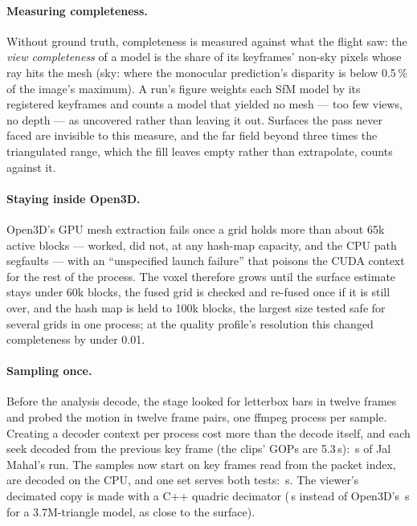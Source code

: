 \documentclass[10pt,a4paper,twocolumn]{article}
\begin{document}
\paragraph{Measuring completeness.} Without ground truth, completeness is measured against what the flight saw: the \emph{view completeness} of a model is the share of its keyframes' non-sky pixels whose ray hits the mesh (sky: where the monocular prediction's disparity is below 0.5\,\% of the image's maximum). A run's figure weights each SfM model by its registered keyframes and counts a model that yielded no mesh --- too few views, no depth --- as uncovered rather than leaving it out. Surfaces the pass never faced are invisible to this measure, and the far field beyond three times the triangulated range, which the fill leaves empty rather than extrapolate, counts against it.

\paragraph{Staying inside Open3D.} Open3D's GPU mesh extraction fails once a grid holds more than about 65k active blocks --- \TsdfOkBlocks{} worked, \TsdfBadBlocks{} did not, at any hash-map capacity, and the CPU path segfaults --- with an ``unspecified launch failure'' that poisons the CUDA context for the rest of the process. The voxel therefore grows until the surface estimate stays under 60k blocks, the fused grid is checked and re-fused once if it is still over, and the hash map is held to 100k blocks, the largest size tested safe for several grids in one process; at the quality profile's resolution this changed completeness by under 0.01.

\paragraph{Sampling once.} Before the analysis decode, the stage looked for letterbox bars in twelve frames and probed the motion in twelve frame pairs, one ffmpeg process per sample. Creating a decoder context per process cost more than the decode itself, and each seek decoded from the previous key frame (the clips' GOPs are 5.3\,s): \SampleBefore\,s of Jal Mahal's run. The samples now start on key frames read from the packet index, are decoded on the CPU, and one set serves both tests: \SampleAfter\,s. The viewer's decimated copy is made with a C++ quadric decimator (\DecimFast\,s instead of Open3D's \DecimOpen\,s for a 3.7M-triangle model, as close to the surface).
\end{document}
